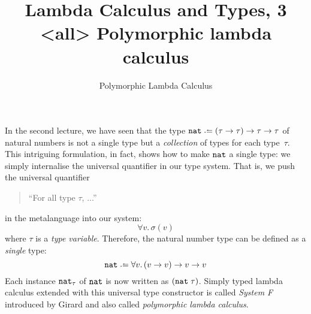\title{Lambda Calculus and Types, 3 \\<all>
  Polymorphic lambda calculus}
\subtitle{Polymorphic Lambda Calculus}

\begin{frame}
\maketitle
\end{frame}

In the second lecture, we have seen that the type $\nat \defeq (\tau \to \tau)
\to \tau \to \tau$ of natural numbers is not a single type but a
\emph{collection} of types for each type~$\tau$. This intriguing formulation, in
fact, shows how to make $\mathtt{nat}$ a single type: we simply internalise the
universal quantifier in our type system. That is, we push the universal
quantifier 
\begin{quote}
``For all type $\tau$, ...''
\end{quote}
in the metalanguage into our system:
\[
  \forall v.\, \sigma(v)
\]
where $\tau$ is a \emph{type variable}. Therefore, the natural number type can
be defined as a \emph{single} type:
\[
  \nat \defeq \forall v.\, (v \to v) \to v \to v
\]
Each instance $\mathtt{nat}_\tau$ of $\mathtt{nat}$ is now written as $(\mathtt{nat}\;\tau)$.  Simply
typed lambda calculus extended with this universal type constructor is called
\emph{System F} introduced by Girard and also called \emph{polymorphic lambda
  calculus}.

